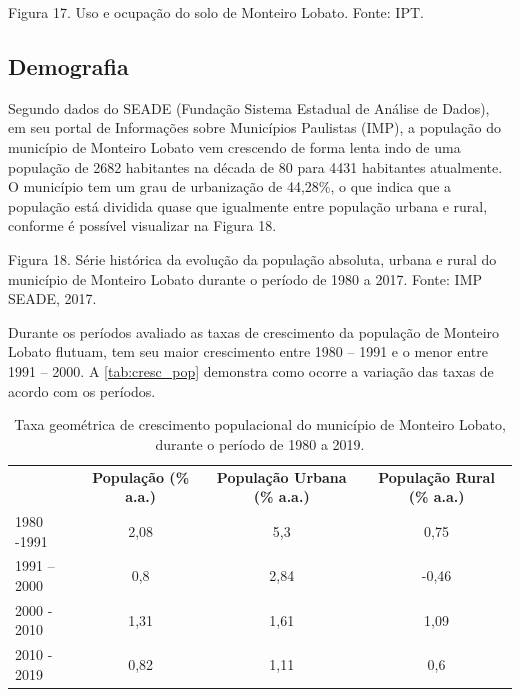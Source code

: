  
Figura 17. Uso e ocupação do solo de Monteiro Lobato.
Fonte: IPT.

\subsection{Demografia}
Segundo dados do SEADE (Fundação Sistema Estadual de Análise de Dados), em seu portal de Informações sobre Municípios Paulistas (IMP), a população do município de Monteiro Lobato vem crescendo de forma lenta indo de uma população de 2682 habitantes na década de 80 para 4431 habitantes atualmente. O município tem um grau de urbanização de 44,28\%, o que indica que a população está dividida quase que igualmente entre população urbana e rural, conforme é possível visualizar na Figura 18. 
 
Figura 18. Série histórica da evolução da população absoluta, urbana e rural do município de Monteiro Lobato durante o período de 1980 a 2017.
Fonte: IMP SEADE, 2017.

Durante os períodos avaliado as taxas de crescimento da população de Monteiro Lobato flutuam, tem seu maior crescimento entre 1980 – 1991 e o menor entre 1991 – 2000. A \autoref{tab:cresc_pop} demonstra como ocorre a variação das taxas de acordo com os períodos.


\begin{table}[htbp]
	\centering
	\caption{Taxa geométrica de crescimento populacional do município de Monteiro Lobato, durante o período de 1980 a 2019.}
	\begin{tabular}{p{7.355em}|c|c|c}
		\rowcolor[rgb]{ .969,  .588,  .275} \multicolumn{1}{p{7.355em}}{\textcolor[rgb]{ 1,  1,  1}{\textbf{Período}}} & \multicolumn{1}{p{6.645em}}{\textcolor[rgb]{ 1,  1,  1}{\textbf{População (\% a.a.)}}} & \multicolumn{1}{p{8.645em}}{\textcolor[rgb]{ 1,  1,  1}{\textbf{População Urbana (\% a.a.)}}} & \multicolumn{1}{p{7.5em}}{\textcolor[rgb]{ 1,  1,  1}{\textbf{População Rural (\% a.a.)}}} \\
		\rowcolor[rgb]{ .992,  .914,  .851} 1980 -1991 & 2,08  & 5,3   & 0,75 \\
		\rowcolor[rgb]{ .984,  .831,  .706} 1991 – 2000 & 0,8   & 2,84  & -0,46 \\
		\rowcolor[rgb]{ .992,  .914,  .851} 2000 - 2010 & 1,31  & 1,61  & 1,09 \\
		\rowcolor[rgb]{ .984,  .831,  .706} 2010 - 2019 & 0,82  & 1,11  & 0,6 \\
	\end{tabular}%
	\label{tab:cresc_pop}%
\end{table}%


